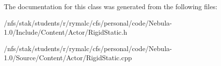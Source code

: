 The documentation for this class was generated from the following files:\begin{DoxyCompactItemize}
\item 
/nfs/stak/students/r/rymalc/cfs/personal/code/Nebula-\/1.0/Include/Content/Actor/RigidStatic.h\item 
/nfs/stak/students/r/rymalc/cfs/personal/code/Nebula-\/1.0/Source/Content/Actor/RigidStatic.cpp\end{DoxyCompactItemize}
